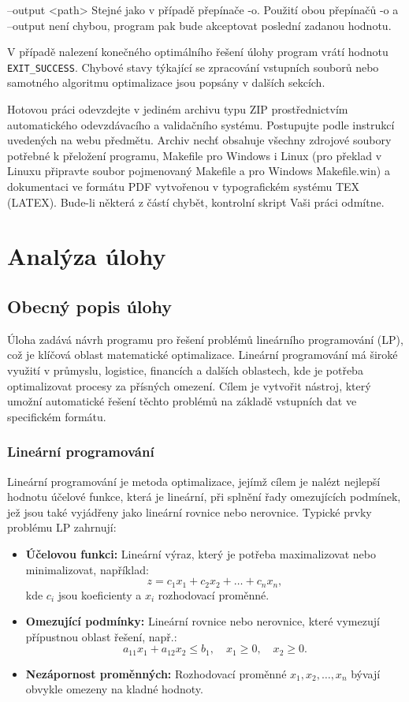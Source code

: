 \documentclass[czech, sem, kiv, he, pdf, viewonly]{fasthesis}
\begin{document}
--output <path> Stejné jako v případě přepínače -o. Použití obou přepínačů -o a --output není chybou, program pak bude akceptovat poslední zadanou hodnotu.

V případě nalezení konečného optimálního řešení úlohy program vrátí hodnotu \verb|EXIT_SUCCESS|. Chybové stavy týkající se zpracování vstupních souborů nebo samotného algoritmu optimalizace
jsou popsány v dalších sekcích.

Hotovou práci odevzdejte v jediném archivu typu ZIP prostřednictvím automatického odevzdávacího a validačního systému. Postupujte podle instrukcí uvedených na webu předmětu. Archiv nechť obsahuje všechny zdrojové soubory potřebné k přeložení programu, Makefile pro Windows i Linux (pro překlad v Linuxu připravte soubor pojmenovaný Makefile a pro Windows Makefile.win)
a dokumentaci ve formátu PDF vytvořenou v typografickém systému TEX (LATEX). Bude-li některá z částí chybět, kontrolní skript Vaši práci odmítne.
%
%
%
%
%
%
\chapter{Analýza úlohy}
\section{Obecný popis úlohy}

Úloha zadává návrh programu pro řešení problémů lineárního programování (LP), což je klíčová oblast matematické optimalizace. Lineární programování má široké využití v průmyslu, logistice, financích a dalších oblastech, kde je potřeba optimalizovat procesy za přísných omezení. Cílem je vytvořit nástroj, který umožní automatické řešení těchto problémů na základě vstupních dat ve specifickém formátu.

\subsection{Lineární programování}
Lineární programování je metoda optimalizace, jejímž cílem je nalézt nejlepší hodnotu účelové funkce, která je lineární, při splnění řady omezujících podmínek, jež jsou také vyjádřeny jako lineární rovnice nebo nerovnice. Typické prvky problému LP zahrnují:
\begin{itemize}
    \item \textbf{Účelovou funkci:} Lineární výraz, který je potřeba maximalizovat nebo minimalizovat, například:
    \[
    z = c_1x_1 + c_2x_2 + \dots + c_nx_n,
    \]
    kde \(c_i\) jsou koeficienty a \(x_i\) rozhodovací proměnné.
    \item \textbf{Omezující podmínky:} Lineární rovnice nebo nerovnice, které vymezují přípustnou oblast řešení, např.:
    \[
    a_{11}x_1 + a_{12}x_2 \leq b_1, \quad x_1 \geq 0, \quad x_2 \geq 0.
    \]
    \item \textbf{Nezápornost proměnných:} Rozhodovací proměnné \(x_1, x_2, \dots, x_n\) bývají obvykle omezeny na kladné hodnoty.
\end{itemize}
\end{document}
